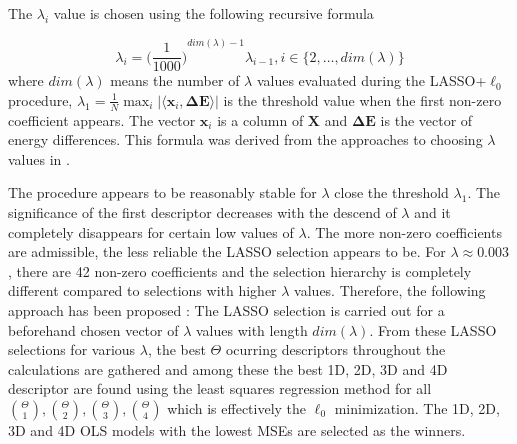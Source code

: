 \documentclass[11pt,oneside,czech,american]{book} %
\theoremstyle{plain}
\theoremstyle{definition}
\renewcommand{\vec}[1]{\boldsymbol{#1}}
\begin{document}
The $\lambda_i$ value is chosen using the following recursive formula

\begin{equation}
	\lambda_i = {\Bigg(\frac{1}{1000}\Bigg)}^{dim(\lambda)-1} \lambda_{i-1}, i \in \{2, \dots, dim(\lambda)\}
\end{equation}
where $dim(\lambda)$ means the number of $\lambda$ values evaluated during the LASSO+$\ell_{0}$ procedure, $\lambda_1 = \frac{1}{N} \max_{i} | \langle \vec{x}_i , \vec{\Delta E} \rangle|$ is the threshold value when the first non-zero coefficient appears. The vector $\vec{x}_i$ is a column of $\vec{X}$ and $\vec{\Delta E}$ is the vector of energy differences. This formula was derived from the approaches to choosing $\lambda$ values in \parencite{ghiringhelli17}.

The procedure appears to be reasonably stable for $\lambda$ close the threshold $\lambda_1$. The significance of the first descriptor decreases with the descend of $\lambda$ and it completely disappears for certain low values of $\lambda$. The more non-zero coefficients are admissible, the less reliable the LASSO selection appears to be. For $\lambda \approx 0.003$, there are 42 non-zero coefficients and the selection hierarchy is completely different compared to selections with higher $\lambda$ values. Therefore, the following approach has been proposed \parencite{ghiringhelli15}: The LASSO selection is carried out for a beforehand chosen vector of $\lambda$ values with length $dim(\lambda)$. From these LASSO selections for various $\lambda$, the best $\Theta$ ocurring descriptors throughout the calculations are gathered and among
these the best 1D, 2D, 3D and 4D descriptor are found using the least squares regression method for all $\binom{\Theta}{1}, \binom{\Theta}{2}, \binom{\Theta}{3}, \binom{\Theta}{4}$ which is effectively the $\ell_{0}$ minimization. The 1D, 2D, 3D and 4D OLS models with the lowest MSEs are selected as the winners.


\end{document}
